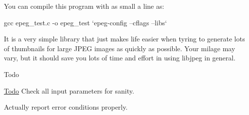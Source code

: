 You can compile this program with as small a line as\-:

\begin{DoxyVerb}gcc epeg_test.c -o epeg_test `epeg-config --cflags --libs`
\end{DoxyVerb}


It is a very simple library that just makes life easier when tyring to generate lots of thumbnails for large J\-P\-E\-G images as quickly as possible. Your milage may vary, but it should save you lots of time and effort in using libjpeg in general.

\begin{DoxyRefDesc}{Todo}
\item[\hyperlink{todo__todo000001}{Todo}]Check all input parameters for sanity. 

Actually report error conditions properly.\end{DoxyRefDesc}
